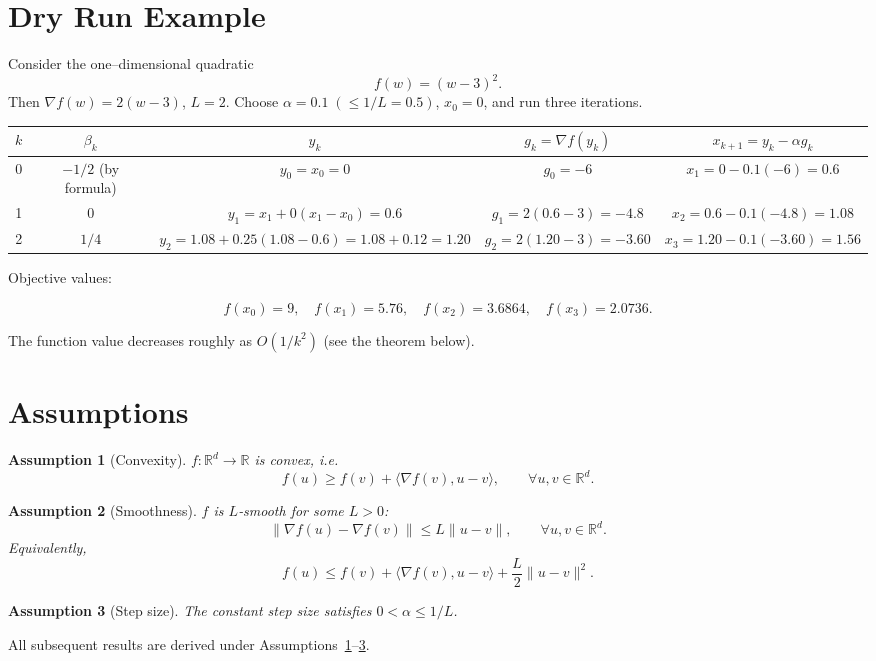 \documentclass[11pt]{article}
\newtheorem{assumption}{Assumption}
\newcommand{\R}{\mathbb{R}}
\begin{document}
\section{Dry Run Example}
Consider the one–dimensional quadratic
\[
f(w) = (w-3)^2 .
\]
Then $\nabla f(w)=2(w-3)$, $L=2$.  
Choose $\alpha = 0.1\;( \le 1/L=0.5)$, $x_0=0$, and run three iterations.

\begin{center}
\begin{tabular}{c|c|c|c|c}
$k$ & $\beta_k$ & $y_k$ & $g_k=\nabla f(y_k)$ & $x_{k+1}=y_k-\alpha g_k$ \\ \hline
0 & $-1/2$ (by formula) & $y_0 = x_0 =0$ & $g_0 = -6$ & $x_1 = 0-0.1(-6)=0.6$ \\[4pt]
1 & $0$ & $y_1 = x_1 +0(x_1-x_0)=0.6$ & $g_1 = 2(0.6-3)=-4.8$ & $x_2 =0.6-0.1(-4.8)=1.08$ \\[4pt]
2 & $1/4$ & $y_2 =1.08+0.25(1.08-0.6)=1.08+0.12=1.20$ & $g_2 = 2(1.20-3)=-3.60$ & $x_3 =1.20-0.1(-3.60)=1.56$
\end{tabular}
\end{center}

Objective values:

\[
f(x_0)=9,\quad f(x_1)=5.76,\quad f(x_2)=3.6864,\quad f(x_3)=2.0736.
\]

The function value decreases roughly as $O(1/k^2)$ (see the theorem below).

\section{Assumptions}
\begin{assumption}[Convexity]\label{as:convex}
$f:\R^d\to\R$ is convex, i.e.
\[
f(u)\ge f(v)+\langle\nabla f(v),u-v\rangle,\qquad\forall u,v\in\R^d .
\]
\end{assumption}
\begin{assumption}[Smoothness]\label{as:smooth}
$f$ is $L$‑smooth for some $L>0$:
\[
\|\nabla f(u)-\nabla f(v)\|\le L\|u-v\|,\qquad\forall u,v\in\R^d .
\]
Equivalently,
\[
f(u)\le f(v)+\langle\nabla f(v),u-v\rangle+\frac{L}{2}\|u-v\|^2 .
\]
\end{assumption}
\begin{assumption}[Step size]\label{as:step}
The constant step size satisfies $0<\alpha\le 1/L$.
\end{assumption}
All subsequent results are derived under Assumptions~\ref{as:convex}–\ref{as:step}.
\end{document}
